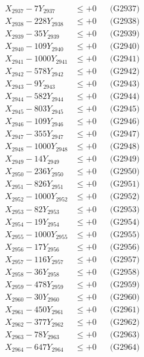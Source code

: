 \documentclass[a4paper,10pt]{article}
\begin{document}
{\begin{align}
X_{2937} - 7Y_{2937} &\leq +0 && \text{(G2937)} \\
X_{2938} - 228Y_{2938} &\leq +0 && \text{(G2938)} \\
X_{2939} - 35Y_{2939} &\leq +0 && \text{(G2939)} \\
X_{2940} - 109Y_{2940} &\leq +0 && \text{(G2940)} \\
\allowbreak
X_{2941} - 1000Y_{2941} &\leq +0 && \text{(G2941)} \\
X_{2942} - 578Y_{2942} &\leq +0 && \text{(G2942)} \\
X_{2943} - 9Y_{2943} &\leq +0 && \text{(G2943)} \\
X_{2944} - 582Y_{2944} &\leq +0 && \text{(G2944)} \\
X_{2945} - 803Y_{2945} &\leq +0 && \text{(G2945)} \\
X_{2946} - 109Y_{2946} &\leq +0 && \text{(G2946)} \\
X_{2947} - 355Y_{2947} &\leq +0 && \text{(G2947)} \\
X_{2948} - 1000Y_{2948} &\leq +0 && \text{(G2948)} \\
X_{2949} - 14Y_{2949} &\leq +0 && \text{(G2949)} \\
X_{2950} - 236Y_{2950} &\leq +0 && \text{(G2950)} \\
\allowbreak
X_{2951} - 826Y_{2951} &\leq +0 && \text{(G2951)} \\
X_{2952} - 1000Y_{2952} &\leq +0 && \text{(G2952)} \\
X_{2953} - 82Y_{2953} &\leq +0 && \text{(G2953)} \\
X_{2954} - 19Y_{2954} &\leq +0 && \text{(G2954)} \\
X_{2955} - 1000Y_{2955} &\leq +0 && \text{(G2955)} \\
X_{2956} - 17Y_{2956} &\leq +0 && \text{(G2956)} \\
X_{2957} - 116Y_{2957} &\leq +0 && \text{(G2957)} \\
X_{2958} - 36Y_{2958} &\leq +0 && \text{(G2958)} \\
X_{2959} - 478Y_{2959} &\leq +0 && \text{(G2959)} \\
X_{2960} - 30Y_{2960} &\leq +0 && \text{(G2960)} \\
\allowbreak
X_{2961} - 450Y_{2961} &\leq +0 && \text{(G2961)} \\
X_{2962} - 377Y_{2962} &\leq +0 && \text{(G2962)} \\
X_{2963} - 78Y_{2963} &\leq +0 && \text{(G2963)} \\
X_{2964} - 647Y_{2964} &\leq +0 && \text{(G2964)} \\

\end{align}}
\end{document}
